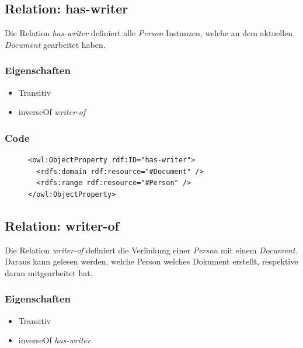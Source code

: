 \documentclass[
    11pt,
    latin1,
    a4paper,
    oneside
]{scrreprt}
\begin{document}
\subsection{Relation: has-writer} \label{sec:rel_haswriter}

Die Relation \emph{has-writer} definiert alle \emph{Person} Instanzen, welche an dem aktuellen \emph{Document} gearbeitet haben.

\subsubsection{Eigenschaften} \label{sec:rel_haswriter_settings}

\begin{itemize}
  \item Transitiv
  \item inverseOf \emph{writer-of}
\end{itemize}

\subsubsection{Code} \label{sec:rel_haswriter_code}

\begin{figure}[H]
 \lstset{language=XML}
 \begin{lstlisting}[label=owl:haswriter,caption={Die Relation \emph{has-writer} gibt an, welche \emph{Person} an dem \emph{Document} geschrieben hat}]
<owl:ObjectProperty rdf:ID="has-writer">
  <rdfs:domain rdf:resource="#Document" />
  <rdfs:range rdf:resource="#Person" />
</owl:ObjectProperty>
 \end{lstlisting}
\end{figure}


\subsection{Relation: writer-of} \label{sec:rel_writerof}

Die Relation \emph{writer-of} definiert die Verlinkung einer \emph{Person} mit einem \emph{Document}. Daraus kann gelesen werden, welche Person welches Dokument erstellt, respektive daran mitgearbeitet hat.

\subsubsection{Eigenschaften} \label{sec:rel_writerof_settings}

\begin{itemize}
  \item Transitiv
  \item inverseOf \emph{has-writer}
\end{itemize}
\end{document}
